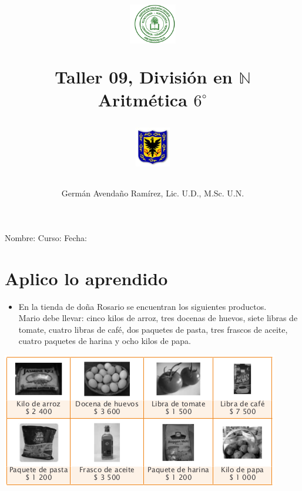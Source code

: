 \documentclass[letterpaper,11pt,twoside]{article}
\author{Germ\'an Avenda\~no Ram\'irez, Lic. U.D., M.Sc. U.N.}
\title{\begin{minipage}{.2\textwidth}
\includegraphics[height=1.75cm]{Images/logo-colegio.png}\end{minipage}
\begin{minipage}{.55\textwidth}
\begin{center}
Taller 09, Divisi\'{o}n en $\mathbb{N}$\\
Aritm\'{e}tica $6^{\circ}$
\end{center}
\end{minipage}\hfill
\begin{minipage}{.2\textwidth}
\includegraphics[height=1.75cm]{Images/logo-sed.png} 
\end{minipage}}
\date{}
\begin{document}
\maketitle
Nombre: \hrulefill Curso: \underline{\hspace*{44pt}} Fecha: \underline{\hspace*{2.5cm}}
 \section*{Aplico lo aprendido}
 \begin{minipage}{.3\textwidth}
  \begin{itemize}
 \item En la tienda de doña Rosario se encuentran los
siguientes productos.\\

Mario debe llevar: cinco kilos de arroz, tres docenas de
huevos, siete libras de tomate, cuatro libras de café, dos
paquetes de pasta, tres frascos de aceite, cuatro paquetes
de harina y ocho kilos de papa.
\end{itemize}
 \end{minipage}\hfill
 \begin{minipage}{.7\textwidth}
\begin{center}
\includegraphics[scale=.76]{Images/productos.png} 
\end{center} 
 \end{minipage}
\end{document}
